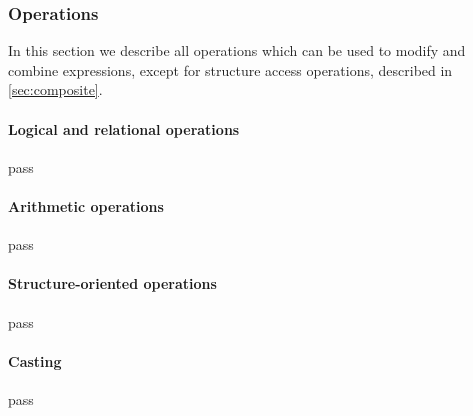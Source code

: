 \subsubsection{Operations}
\label{sec:operations}
In this section we describe all operations which can be used to modify and combine expressions, except for structure access operations, described in \ref{sec:composite}.

\paragraph{Logical and relational operations}
pass

\paragraph{Arithmetic operations}
pass

\paragraph{Structure-oriented operations}
pass

\paragraph{Casting}
\label{sec:casting}
pass